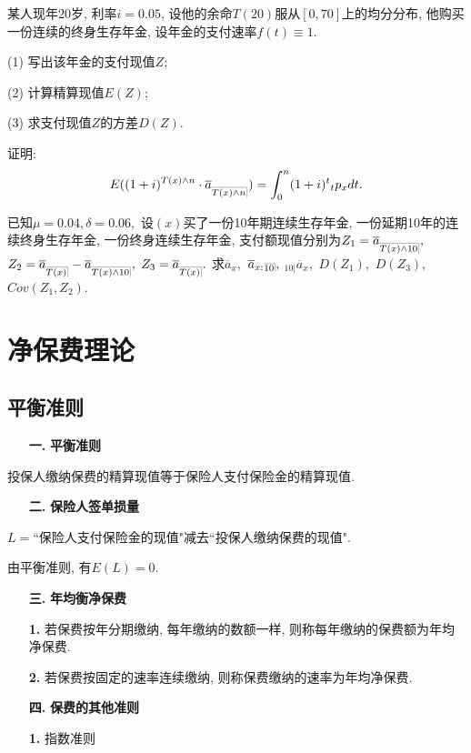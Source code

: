 \documentclass[a4paper,openany, 10pt]{ctexbook}
\makeatletter
\newcommand{\hei}{\CJKfamily{hei}}      %
\DeclareRobustCommand{\annu}[1]{_{%
    \def\arraystretch{0}%
    \setlength\arraycolsep{1pt}%
    \setlength\arrayrulewidth{.2pt}%
    \begin{array}[b]{@{}c|}\hline
        \\[\arraycolsep]%
        \scriptstyle #1%
    \end{array}%
}}
\makeatother
\begin{document}
\begin{exs}
    某人现年$20$岁, 利率$i = 0.05$, 设他的余命$T(20)$服从$[0, 70]$上的均分分布, 他购买一份连续的终身生存年金, 设年金的支付速率$f(t) \equiv 1$.

    (1) 写出该年金的支付现值$Z$;

    (2) 计算精算现值$E(Z)$;

    (3) 求支付现值$Z$的方差$D(Z)$.
\end{exs}
\begin{exs}
    证明:
    $$E((1+i)^{T(x)\wedge n}\cdot \overline{a}_{\annu{T(x)\wedge n}})=\int_0^{n} (1+i)^{t}{}_tp_xdt.$$
\end{exs}
\begin{exs}
已知$\mu=0.04, \delta=0.06, $ 设$(x)$买了一份10年期连续生存年金, 一份延期10年的连续终身生存年金, 一份终身连续生存年金, 支付额现值分别为$Z_1=\overline a_{\annu {T(x) \land 10}},$ $Z_2=\overline a_{\annu {T(x) }}-\overline a_{\annu {T(x) \land 10}},$ $Z_3=\overline a_{\annu {T(x) }}.$
求$\overline a_{x},$ $\overline a_{{x:}}{}\annu{10},$ ${}_{10|}\overline{a}_{x},$ $D(Z_1),$ $D(Z_3),$ $Cov(Z_1,Z_2)$.
\end{exs}

\chapter{净保费理论}
\section{平衡准则}
\begin{itemize}
    \item[{\bf\hei 一.}]{\bf\hei 平衡准则}
\end{itemize}

投保人缴纳保费的精算现值等于保险人支付保险金的精算现值.
\begin{itemize}
    \item[{\bf\hei 二.}]{\bf\hei 保险人签单损量}
\end{itemize}

$L=$``保险人支付保险金的现值"减去``投保人缴纳保费的现值".

由平衡准则, 有$E(L)=0.$
\begin{itemize}
    \item[{\bf\hei 三.}]{\bf\hei 年均衡净保费}
\end{itemize}
\begin{itemize}
    \item[{\bf\hei1.}] 若保费按年分期缴纳, 每年缴纳的数额一样, 则称每年缴纳的保费额为年均净保费.
\end{itemize}
\begin{itemize}
    \item[{\bf\hei2.}] 若保费按固定的速率连续缴纳, 则称保费缴纳的速率为年均净保费.
\end{itemize}
\begin{itemize}
    \item[{\bf\hei 四.}]{\bf\hei 保费的其他准则}
\end{itemize}
\begin{itemize}
    \item[{\bf\hei1.}] 指数准则
\end{itemize}
\end{document}
